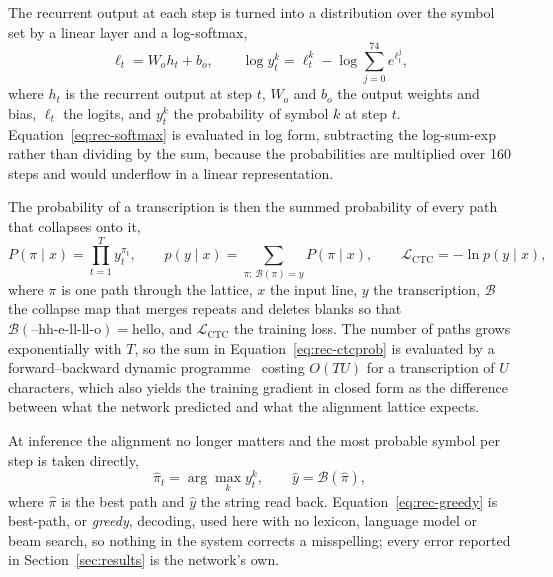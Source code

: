 The recurrent output at each step is turned into a distribution over the symbol set by a linear layer and a log-softmax,
\begin{equation}
\ell_t=W_oh_t+b_o,\qquad \log y_t^k=\ell_t^k-\log\sum_{j=0}^{74}e^{\ell_t^j},
\label{eq:rec-softmax}
\end{equation}
where $h_t$ is the recurrent output at step $t$, $W_o$ and $b_o$ the output weights and bias, $\ell_t$ the logits, and $y_t^k$ the probability of symbol $k$ at step $t$. Equation~\ref{eq:rec-softmax} is evaluated in log form, subtracting the log-sum-exp rather than dividing by the sum, because the probabilities are multiplied over 160 steps and would underflow in a linear representation.

The probability of a transcription is then the summed probability of every path that collapses onto it,
\begin{equation}
P(\pi\mid x)=\prod_{t=1}^{T}y_t^{\pi_t},\qquad p(y\mid x)=\!\!\sum_{\pi:\,\mathcal B(\pi)=y}\!\!P(\pi\mid x),\qquad \mathcal L_{\mathrm{CTC}}=-\ln p(y\mid x),
\label{eq:rec-ctcprob}
\end{equation}
where $\pi$ is one path through the lattice, $x$ the input line, $y$ the transcription, $\mathcal B$ the collapse map that merges repeats and deletes blanks so that $\mathcal B(\text{--hh-e-ll-ll-o})=\text{hello}$, and $\mathcal L_{\mathrm{CTC}}$ the training loss. The number of paths grows exponentially with $T$, so the sum in Equation~\ref{eq:rec-ctcprob} is evaluated by a forward--backward dynamic programme~\cite[p.~372]{graves2006} costing $O(TU)$ for a transcription of $U$ characters, which also yields the training gradient in closed form as the difference between what the network predicted and what the alignment lattice expects.

At inference the alignment no longer matters and the most probable symbol per step is taken directly,
\begin{equation}
\hat\pi_t=\arg\max_k y_t^k,\qquad \hat y=\mathcal B(\hat\pi),
\label{eq:rec-greedy}
\end{equation}
where $\hat\pi$ is the best path and $\hat y$ the string read back. Equation~\ref{eq:rec-greedy} is best-path, or \emph{greedy}, decoding, used here with no lexicon, language model or beam search, so nothing in the system corrects a misspelling; every error reported in Section~\ref{sec:results} is the network's own.

